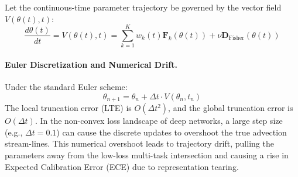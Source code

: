 \documentclass{article}
\theoremstyle{plain}
\theoremstyle{definition}
\theoremstyle{remark}
\begin{document}
Let the continuous-time parameter trajectory be governed by the vector field $V(\theta(t), t)$:
\begin{equation}
\frac{d\theta(t)}{dt} = V(\theta(t), t) = \sum_{k=1}^K w_k(t) \mathbf{F}_k(\theta(t)) + \nu \mathbf{D}_{\text{Fisher}}(\theta(t))
\end{equation}

\paragraph{Euler Discretization and Numerical Drift.} Under the standard Euler scheme:
\begin{equation}
\theta_{n+1} = \theta_n + \Delta t \cdot V(\theta_n, t_n)
\end{equation}
The local truncation error (LTE) is $O(\Delta t^2)$, and the global truncation error is $O(\Delta t)$. In the non-convex loss landscape of deep networks, a large step size (e.g., $\Delta t = 0.1$) can cause the discrete updates to overshoot the true advection stream-lines. This numerical overshoot leads to trajectory drift, pulling the parameters away from the low-loss multi-task intersection and causing a rise in Expected Calibration Error (ECE) due to representation tearing.
\end{document}
